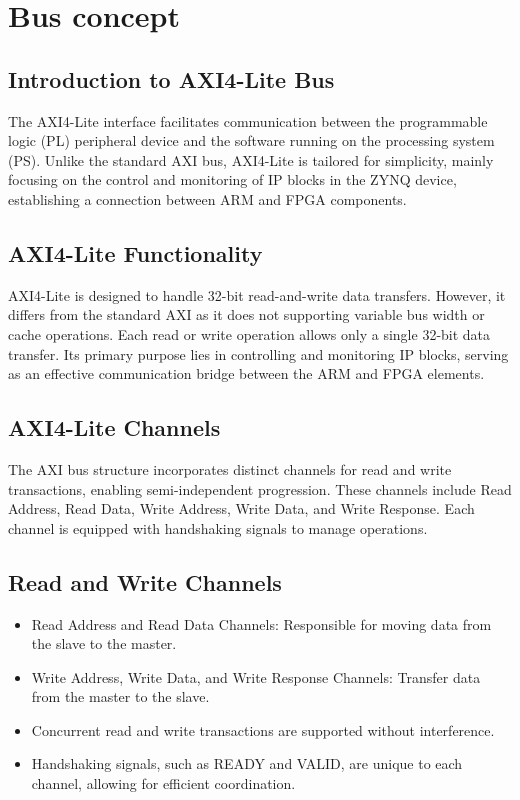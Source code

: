 
\section{Bus concept}

\subsection{Introduction to AXI4-Lite Bus}
The AXI4-Lite interface facilitates communication between the programmable logic (PL) peripheral device and the software running on the processing system (PS). Unlike the standard AXI bus, AXI4-Lite is tailored for simplicity, mainly focusing on the control and monitoring of IP blocks in the ZYNQ device, establishing a connection between ARM and FPGA components.

\subsection{AXI4-Lite Functionality}
AXI4-Lite is designed to handle 32-bit read-and-write data transfers. However, it differs from the standard AXI as it does not supporting variable bus width or cache operations. Each read or write operation allows only a single 32-bit data transfer. Its primary purpose lies in controlling and monitoring IP blocks, serving as an effective communication bridge between the ARM and FPGA elements.
\subsection{AXI4-Lite Channels}
The AXI bus structure incorporates distinct channels for read and write transactions, enabling semi-independent progression. These channels include Read Address, Read Data, Write Address, Write Data, and Write Response. Each channel is equipped with handshaking signals to manage operations.
\subsection{Read and Write Channels} 
\begin{itemize}
    \item 	Read Address and Read Data Channels: Responsible for moving data from the slave to the master.
    \item 	Write Address, Write Data, and Write Response Channels: Transfer data from the master to the slave.
    \item 	Concurrent read and write transactions are supported without interference.
    \item 	Handshaking signals, such as READY and VALID, are unique to each channel, allowing for efficient coordination.
\end{itemize}

